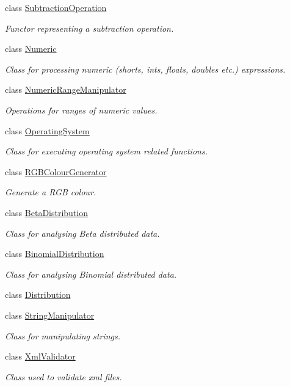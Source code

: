 \begin{DoxyCompactItemize}
class \hyperlink{classmultiscale_1_1SubtractionOperation}{Subtraction\-Operation}
\begin{DoxyCompactList}\small\item\em Functor representing a subtraction operation. \end{DoxyCompactList}\item 
class \hyperlink{classmultiscale_1_1Numeric}{Numeric}
\begin{DoxyCompactList}\small\item\em Class for processing numeric (shorts, ints, floats, doubles etc.) expressions. \end{DoxyCompactList}\item 
class \hyperlink{classmultiscale_1_1NumericRangeManipulator}{Numeric\-Range\-Manipulator}
\begin{DoxyCompactList}\small\item\em Operations for ranges of numeric values. \end{DoxyCompactList}\item 
class \hyperlink{classmultiscale_1_1OperatingSystem}{Operating\-System}
\begin{DoxyCompactList}\small\item\em Class for executing operating system related functions. \end{DoxyCompactList}\item 
class \hyperlink{classmultiscale_1_1RGBColourGenerator}{R\-G\-B\-Colour\-Generator}
\begin{DoxyCompactList}\small\item\em Generate a R\-G\-B colour. \end{DoxyCompactList}\item 
class \hyperlink{classmultiscale_1_1BetaDistribution}{Beta\-Distribution}
\begin{DoxyCompactList}\small\item\em Class for analysing Beta distributed data. \end{DoxyCompactList}\item 
class \hyperlink{classmultiscale_1_1BinomialDistribution}{Binomial\-Distribution}
\begin{DoxyCompactList}\small\item\em Class for analysing Binomial distributed data. \end{DoxyCompactList}\item 
class \hyperlink{classmultiscale_1_1Distribution}{Distribution}
\item 
class \hyperlink{classmultiscale_1_1StringManipulator}{String\-Manipulator}
\begin{DoxyCompactList}\small\item\em Class for manipulating strings. \end{DoxyCompactList}\item 
class \hyperlink{classmultiscale_1_1XmlValidator}{Xml\-Validator}
\begin{DoxyCompactList}\small\item\em Class used to validate xml files. \end{DoxyCompactList}\end{DoxyCompactItemize}
